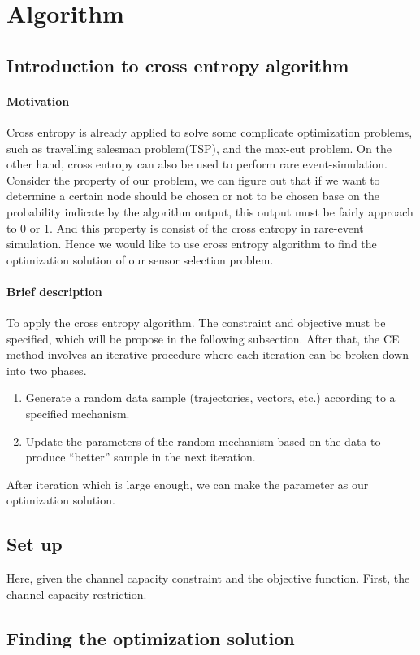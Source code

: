 \section{Algorithm}
\subsection{Introduction to cross entropy algorithm}
\paragraph{Motivation}
Cross entropy is already applied to solve some complicate optimization problems, such as travelling salesman problem(TSP), and  the max-cut problem. On the other hand, cross entropy can also be used to perform rare event-simulation. Consider the property of our problem, we can figure out that if we want to determine a certain node should be chosen or not to be chosen base on the probability indicate by the algorithm output, this output must be fairly approach to 0 or 1. And this property is 
consist of the cross entropy in rare-event simulation. Hence we would like to use cross entropy algorithm to find the optimization solution of our sensor selection problem. 
\paragraph{Brief description}
To apply the cross entropy algorithm. The constraint and objective must be specified, which will be 
propose in the following subsection. After that, the CE method involves an iterative procedure where each iteration can be broken down into two phases.

\begin{enumerate}
\item Generate a random data sample (trajectories, vectors, etc.) according to a specified mechanism.
\item Update the parameters of the random mechanism based on the data to produce “better” sample 
in the next iteration.
\end{enumerate}  
After iteration which is large enough, we can make the parameter as our optimization solution.

\subsection{Set up}
Here, given the channel capacity constraint and the objective function. First, the channel capacity restriction.

\subsection{Finding the optimization solution}


